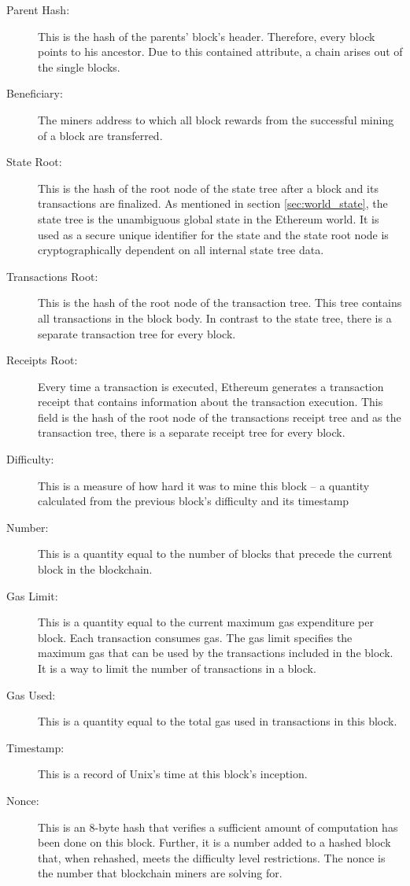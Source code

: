 \begin{description}
	\item[Parent Hash:] This is the hash of the parents' block's header. Therefore, every block points to his ancestor. Due to this contained attribute, a chain arises out of the single blocks.
	\item[Beneficiary:] The miners address to which all block rewards from the successful mining of a block are transferred.
	\item[State Root:] This is the hash of the root node of the state tree after a block and its transactions are finalized. As mentioned in section 
	\ref{sec:world_state}, the state tree is the unambiguous global state in the Ethereum world. It is used as a secure unique identifier for the state and the state root node is cryptographically dependent on all internal state tree data.
	\item[Transactions Root:] This is the hash of the root node of the transaction tree. This tree contains all transactions in the block body. In contrast to the state tree, there is a separate transaction tree for every block. 
	\item[Receipts Root:] Every time a transaction is executed, Ethereum generates a transaction receipt that contains information about the transaction execution. This field is the hash of the root node of the transactions receipt tree and as the transaction tree, there is a separate receipt tree for every block.
	\item[Difficulty:] This is a measure of how hard it was to mine this block – a quantity calculated from the previous block’s difficulty and its timestamp
	\item[Number:] This is a quantity equal to the number of blocks that precede the current block in the blockchain.
	\item[Gas Limit:] This is a quantity equal to the current maximum gas expenditure per block. Each transaction consumes gas. The gas limit specifies the maximum gas that can be used by the transactions included in the block. It is a way to limit the number of transactions in a block.
	\item[Gas Used:] This is a quantity equal to the total gas used in transactions in this block.
	\item[Timestamp:] This is a record of Unix’s time at this block’s inception.
	\item[Nonce:] This is an 8-byte hash that verifies a sufficient amount of computation has been done on this block. Further, it is a number added to a hashed block that, when rehashed, meets the difficulty level restrictions. The nonce is the number that blockchain miners are solving for.
\end{description}

